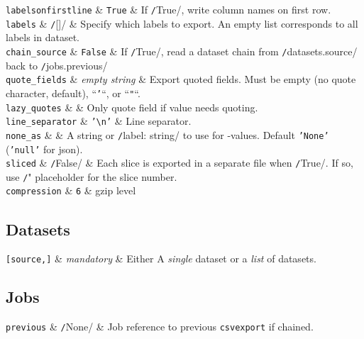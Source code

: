   \RP \texttt{labelsonfirstline} & \texttt{True} & If
  \texttt/True/, write column names on first row.\\
  
  \RP \texttt{labels} & \texttt/[]/ & Specify which labels to
  export.  An empty list corresponds to all labels in dataset.\\
  
  \RP \texttt{chain\_source} & \texttt{False} & If
  \texttt/True/, read a dataset chain from
  \texttt/datasets.source/ back to
  \texttt/jobs.previous/\\

  \RP \texttt{quote\_fields} & \textsl{empty string} & Export quoted fields.  Must be empty
  (no quote character, default), ``\texttt{'}``, or ``\texttt{"}``.\\

  \RP \texttt{lazy\_quotes} & \pyTrue & Only quote field if value needs quoting.\\

  \RP \texttt{line\_separator} & \texttt{'\textbackslash{}n'} & Line separator.\\

  \RP \texttt{none\_as} & \pyNone & A string or
  \texttt/{label: string}/ to use for \pyNone-values. Default
  \texttt{'None'} (\texttt{'null'} for json).\\

  \RP \texttt{sliced} & \texttt/False/ & Each slice is
  exported in a separate file when \texttt/True/.  If so,
  use \texttt/"%
  placeholder for the slice number.\\

  \RP \texttt{compression} & \texttt{6} & gzip level\\
\stoptable


\subsection*{Datasets}
\starttable
  \RP \texttt{[source,]} & \textsl{mandatory} & Either A
  \textsl{single} dataset or a \textsl{list} of datasets.\\
\stoptable


\subsection*{Jobs}
\starttable
  \texttt{previous} & \texttt/None/ & Job reference to
  previous \texttt{csvexport} if chained.\\
\stoptable


